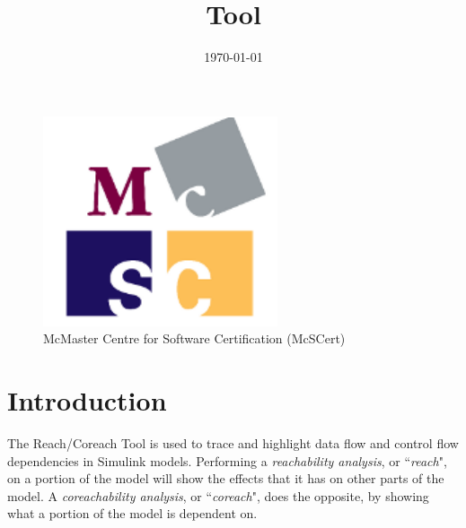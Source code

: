 \documentclass{article}
\title{\ToolName Tool}
\date{\monthyeardate\today}
\makeatletter
\newcommand{\ToolName}{Reach/Coreach\@\xspace}
\makeatother
\begin{document}
\maketitle
\vfill

\begin{figure}
	\centering
	\includegraphics[]{../figs/McSCert_Logo.pdf} \\
	McMaster Centre for Software Certification (McSCert)
\end{figure}

\newpage
\tableofcontents
\newpage

\section{Introduction}

The \ToolName Tool is used to trace and highlight data flow and control flow dependencies in Simulink models. Performing a \emph{reachability analysis}, or ``\emph{reach}", on a portion of the model will show the effects that it has on other parts of the model. A \emph{coreachability analysis}, or ``\emph{coreach}", does the opposite, by showing what a portion of the model is dependent on.
\end{document}
